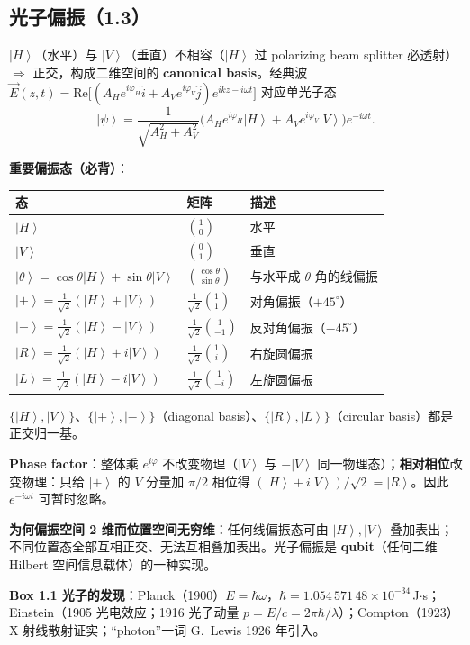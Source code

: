 \documentclass[11pt]{ctexart}
\newcommand{\ket}[1]{\left|#1\right\rangle}
\begin{document}
\subsection{光子偏振（1.3）}

$\ket H$（水平）与 $\ket V$（垂直）不相容（$\ket H$ 过 polarizing beam splitter 必透射）$\Rightarrow$ 正交，构成二维空间的 \textbf{canonical basis}。经典波 $\vec E(z,t)=\mathrm{Re}\!\big[(A_He^{i\varphi_H}\hat i+A_Ve^{i\varphi_V}\hat j)e^{ikz-i\omega t}\big]$ 对应单光子态
\[
\ket\psi=\frac{1}{\sqrt{A_H^2+A_V^2}}\Big(A_He^{i\varphi_H}\ket H+A_Ve^{i\varphi_V}\ket V\Big)e^{-i\omega t}.
\]

\textbf{重要偏振态（必背）}：
\begin{center}
\begin{tabular}{lll}
\toprule
态 & 矩阵 & 描述\\
\midrule
$\ket H$ & $\binom{1}{0}$ & 水平\\
$\ket V$ & $\binom{0}{1}$ & 垂直\\
$\ket\theta=\cos\theta\ket H+\sin\theta\ket V$ & $\binom{\cos\theta}{\sin\theta}$ & 与水平成 $\theta$ 角的线偏振\\
$\ket+=\frac{1}{\sqrt2}(\ket H+\ket V)$ & $\frac{1}{\sqrt2}\binom{1}{1}$ & 对角偏振（$+45^\circ$）\\
$\ket-=\frac{1}{\sqrt2}(\ket H-\ket V)$ & $\frac{1}{\sqrt2}\binom{1}{-1}$ & 反对角偏振（$-45^\circ$）\\
$\ket R=\frac{1}{\sqrt2}(\ket H+i\ket V)$ & $\frac{1}{\sqrt2}\binom{1}{i}$ & 右旋圆偏振\\
$\ket L=\frac{1}{\sqrt2}(\ket H-i\ket V)$ & $\frac{1}{\sqrt2}\binom{1}{-i}$ & 左旋圆偏振\\
\bottomrule
\end{tabular}
\end{center}

$\{\ket H,\ket V\}$、$\{\ket+,\ket-\}$（diagonal basis）、$\{\ket R,\ket L\}$（circular basis）都是正交归一基。

\textbf{Phase factor}：整体乘 $e^{i\varphi}$ 不改变物理（$\ket V$ 与 $-\ket V$ 同一物理态）；\textbf{相对相位}改变物理：只给 $\ket+$ 的 $V$ 分量加 $\pi/2$ 相位得 $(\ket H+i\ket V)/\sqrt2=\ket R$。因此 $e^{-i\omega t}$ 可暂时忽略。

\textbf{为何偏振空间 2 维而位置空间无穷维}：任何线偏振态可由 $\ket H,\ket V$ 叠加表出；不同位置态全部互相正交、无法互相叠加表出。光子偏振是 \textbf{qubit}（任何二维 Hilbert 空间信息载体）的一种实现。

\textbf{Box 1.1 光子的发现}：Planck（1900）$E=\hbar\omega$，$\hbar=1.054\,571\,48\times10^{-34}$\,J$\cdot$s；Einstein（1905 光电效应；1916 光子动量 $p=E/c=2\pi\hbar/\lambda$）；Compton（1923）X 射线散射证实；``photon''一词 G.~Lewis 1926 年引入。
\end{document}
